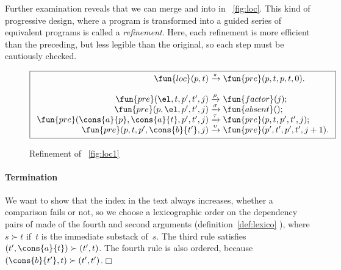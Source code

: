 Further examination reveals that we can merge
 and
 into
 in \fig~\vref{fig:loc}. This kind of progressive
design, where a program is transformed into a guided series of
equivalent programs is called a \emph{refinement}. Here, each
refinement is more efficient than the preceding, but less legible than
the original, so each step must be cautiously checked.
\begin{figure}[h]
\begin{equation*}
\boxed{%
\begin{array}{r@{\;}l@{\;}l}
\fun{loc}(p,t)   & \xrightarrow{\smash{\pi}} & \fun{pre}(p,t,p,t,0).\\
\\
\fun{pre}(\el,t,p',t',j) & \xrightarrow{\smash{\rho}}
                         & \fun{factor}(j);\\
\fun{pre}(p,\el,p',t',j) & \xrightarrow{\smash{\sigma}}
                         & \fun{absent}();\\
\fun{pre}(\cons{a}{p},\cons{a}{t},p',t',j)
                         & \xrightarrow{\smash{\tau}}
                         & \fun{pre}(p,t,p',t',j);\\
\fun{pre}(p,t,p',\cons{b}{t'},j) & \xrightarrow{\smash{\upsilon}}
                         & \fun{pre}(p',t',p',t',j+1).
\end{array}}
\end{equation*}
\caption{Refinement of \fig~\vref{fig:loc1}}
\label{fig:loc}
\end{figure}

\paragraph{Termination}

We want to show that the index in the text always increases, whether a
comparison fails or not, so we choose a lexicographic order on the
dependency pairs of 
made of the fourth and second arguments (definition~\eqref{def:lexico}
), where \(s \succ t\) if~\(t\) is the immediate
substack of~\(s\). The third rule satisfies \((t',\cons{a}{t}) \succ
(t',t)\). The fourth rule is also ordered, because \((\cons{b}{t'},t)
\succ (t',t')\).\hfill\(\Box\)

